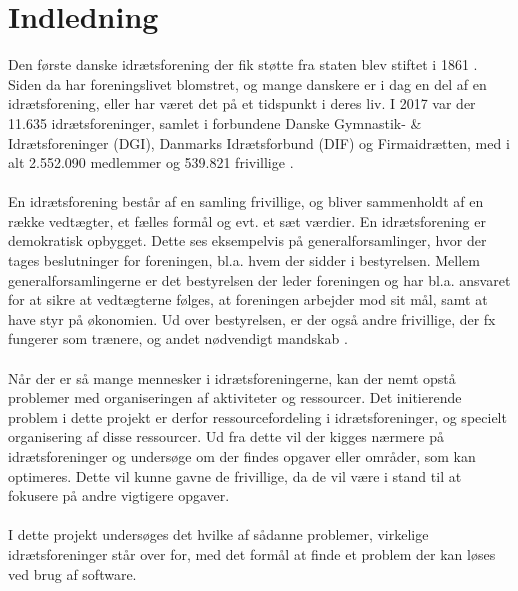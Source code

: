 \chapter{Indledning}\label{ch:introduction}
Den første danske idrætsforening der fik støtte fra staten blev stiftet i 1861 \cite{difhistorie}.\\
Siden da har foreningslivet blomstret, og mange danskere er i dag en del af en idrætsforening, eller har været det på et tidspunkt i deres liv. I 2017 var der 11.635 idrætsforeninger, samlet i forbundene Danske Gymnastik- & Idrætsforeninger (DGI), Danmarks Idrætsforbund (DIF) og Firmaidrætten, med i alt 2.552.090 medlemmer og 539.821 frivillige \cite{fester2018}.
\\\\
En idrætsforening består af en samling frivillige, og bliver sammenholdt af en række vedtægter, et fælles formål og evt. et sæt værdier. En idrætsforening er demokratisk opbygget. Dette ses eksempelvis på generalforsamlinger, hvor der tages beslutninger for foreningen, bl.a. hvem der sidder i bestyrelsen. Mellem generalforsamlingerne er det bestyrelsen der leder foreningen og har bl.a. ansvaret for at sikre at vedtægterne følges, at foreningen arbejder mod sit mål, samt at have styr på økonomien. Ud over bestyrelsen, er der også andre frivillige, der fx fungerer som trænere, og andet nødvendigt mandskab \citep{DGI} \citep{bestyrelsen}.
\\\\
Når der er så mange mennesker i idrætsforeningerne, kan der nemt opstå problemer med organiseringen af aktiviteter og ressourcer. Det initierende problem i dette projekt er derfor ressourcefordeling i idrætsforeninger, og specielt organisering af disse ressourcer.
Ud fra dette vil der kigges nærmere på idrætsforeninger og undersøge om der findes opgaver eller områder, som kan optimeres. Dette vil kunne gavne de frivillige, da de vil være i stand til at fokusere på andre vigtigere opgaver. 
\\\\
I dette projekt undersøges det hvilke af sådanne problemer, virkelige idrætsforeninger står over for, med det formål at finde et problem der kan løses ved brug af software.

